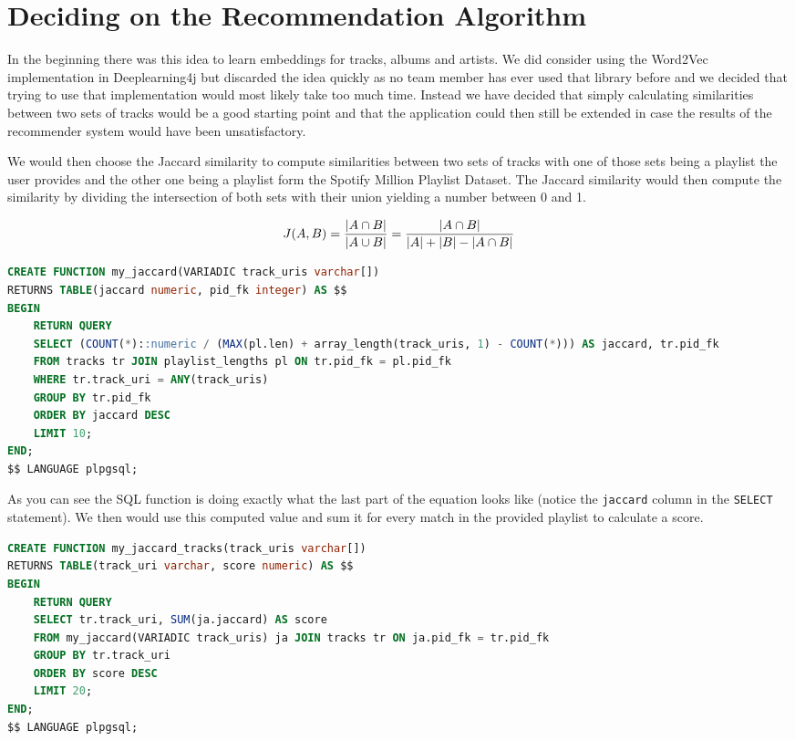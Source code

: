 \section{Deciding on the Recommendation Algorithm}

In the beginning there was this idea to learn embeddings for tracks, albums and artists. We did consider using the Word2Vec implementation in Deeplearning4j but discarded the idea quickly as no team member has ever used that library before and we decided that trying to use that implementation would most likely take too much time. Instead we have decided that simply calculating similarities between two sets of tracks would be a good starting point and that the application could then still be extended in case the results of the recommender system would have been unsatisfactory.

We would then choose the Jaccard similarity to compute similarities between two sets of tracks with one of those sets being a playlist the user provides and the other one being a playlist form the Spotify Million Playlist Dataset. The Jaccard similarity would then compute the similarity by dividing the intersection of both sets with their union yielding a number between 0 and 1.

\begin{equation}
    J(A,B) = {{|A \cap B|}\over{|A \cup B|}} = {{|A \cap B|}\over{|A| + |B| - |A \cap B|}}
\end{equation}

\begin{lstlisting}[caption={Jaccard implementation as a \acs{SQL} function in PostgreSQL}, style=Base, language=SQL]
CREATE FUNCTION my_jaccard(VARIADIC track_uris varchar[])
RETURNS TABLE(jaccard numeric, pid_fk integer) AS $$
BEGIN
    RETURN QUERY
    SELECT (COUNT(*)::numeric / (MAX(pl.len) + array_length(track_uris, 1) - COUNT(*))) AS jaccard, tr.pid_fk
    FROM tracks tr JOIN playlist_lengths pl ON tr.pid_fk = pl.pid_fk
    WHERE tr.track_uri = ANY(track_uris)
    GROUP BY tr.pid_fk
    ORDER BY jaccard DESC
    LIMIT 10;
END;
$$ LANGUAGE plpgsql;
\end{lstlisting}

As you can see the \acs{SQL} function is doing exactly what the last part of the equation looks like (notice the \texttt{jaccard} column in the \texttt{SELECT} statement). We then would use this computed value and sum it for every match in the provided playlist to calculate a score.

\begin{lstlisting}[caption={Using the implementation to compute scores for tracks}, style=Base, language=SQL]
CREATE FUNCTION my_jaccard_tracks(track_uris varchar[])
RETURNS TABLE(track_uri varchar, score numeric) AS $$
BEGIN
    RETURN QUERY
    SELECT tr.track_uri, SUM(ja.jaccard) AS score
    FROM my_jaccard(VARIADIC track_uris) ja JOIN tracks tr ON ja.pid_fk = tr.pid_fk
    GROUP BY tr.track_uri
    ORDER BY score DESC
    LIMIT 20;
END;
$$ LANGUAGE plpgsql;
\end{lstlisting}

